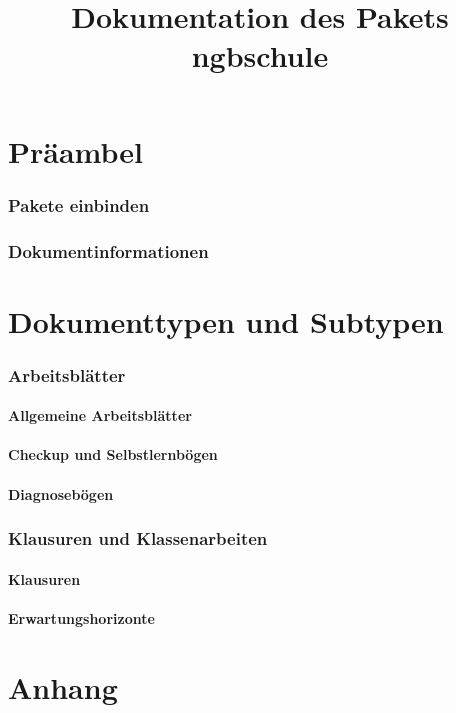 \documentclass[a4paper,add-index,ngerman]{cnltx-doc}
\title{Dokumentation des Pakets ngbschule}
\begin{document}


\part{Präambel}
\section{Pakete einbinden}
\section{Dokumentinformationen}



\part{Dokumenttypen und Subtypen}
\section{Arbeitsblätter}
\subsection{Allgemeine Arbeitsblätter}
\subsection{Checkup und Selbstlernbögen}
\subsection{Diagnosebögen}

\section{Klausuren und Klassenarbeiten}
\subsection{Klausuren}
\subsection{Erwartungshorizonte}



\part{Anhang}
\end{document}
